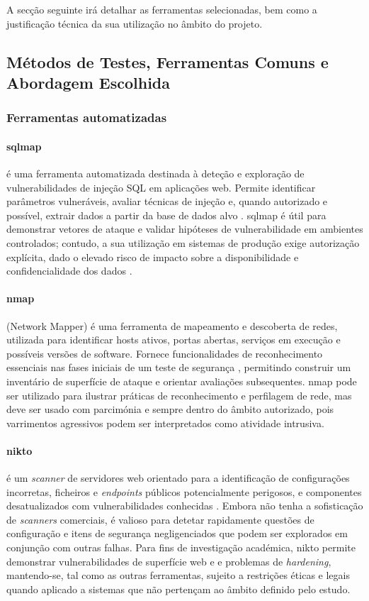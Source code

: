 A secção seguinte irá detalhar as ferramentas selecionadas, bem como a justificação técnica da sua utilização no âmbito do projeto.


\subsection{Métodos de Testes, Ferramentas Comuns e Abordagem Escolhida}

\subsubsection{Ferramentas automatizadas}

\paragraph{sqlmap}

é uma ferramenta automatizada
destinada à deteção e exploração de vulnerabilidades de injeção SQL em aplicações web.
Permite identificar parâmetros vulneráveis, avaliar técnicas de injeção
e, quando autorizado e possível, extrair dados a partir da base de dados alvo \cite{ref2}.
sqlmap é útil para demonstrar vetores de ataque e validar hipóteses de vulnerabilidade
em ambientes controlados; contudo, a sua utilização em sistemas de produção exige autorização explícita,
dado o elevado risco de impacto sobre a disponibilidade e confidencialidade dos dados \cite{ref3}.

\paragraph{nmap}
(Network Mapper) é uma ferramenta de mapeamento e descoberta de redes,
utilizada para identificar hosts ativos, portas abertas, serviços em execução e possíveis versões de software.
Fornece funcionalidades de reconhecimento essenciais nas fases iniciais de um teste de segurança \cite{ref1},
permitindo construir um inventário de superfície de ataque e orientar avaliações subsequentes.
nmap pode ser utilizado para ilustrar práticas de reconhecimento e perfilagem de rede,
mas deve ser usado com parcimónia e sempre dentro do âmbito autorizado,
pois varrimentos agressivos podem ser interpretados como atividade intrusiva.

\paragraph{nikto}

é um \textit{scanner} de servidores web orientado para a identificação de configurações incorretas,
ficheiros e \textit{endpoints} públicos potencialmente perigosos,
e componentes desatualizados com vulnerabilidades conhecidas \cite{ref2}.
Embora não tenha a sofisticação de \textit{scanners} comerciais,
é valioso para detetar rapidamente questões de configuração e itens de segurança negligenciados
que podem ser explorados em conjunção com outras falhas.
Para fins de investigação académica, nikto permite demonstrar vulnerabilidades de superfície web
e e problemas de \textit{hardening}, mantendo-se, tal como as outras ferramentas,
sujeito a restrições éticas e legais quando aplicado a sistemas
que não pertençam ao âmbito definido pelo estudo.

